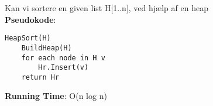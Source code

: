 Kan vi sortere en given list H[1..n], ved hjælp af en heap\\
\textbf{Pseudokode}:
\begin{lstlisting}[frame=single, mathescape=true]
HeapSort(H)
	BuildHeap(H)
	for each node in H v
		Hr.Insert(v)
	return Hr
\end{lstlisting}
\textbf{Running Time}: O(n log n)